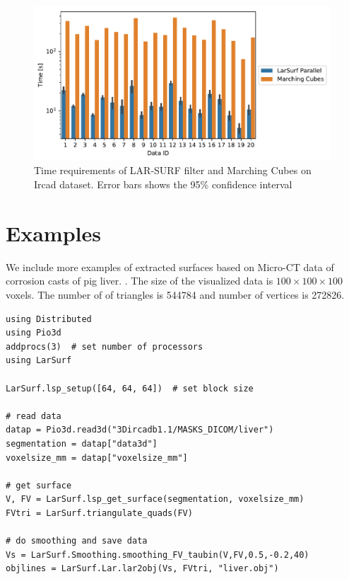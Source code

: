 \documentclass[11pt, oneside]{amsart}   	%
\begin{document}
\begin{figure}
\centering
\includegraphics[width=0.99\textwidth]{figs/ircad_comparison.pdf} 
\caption{Time requirements of LAR-SURF filter and Marching Cubes on Ircad dataset. Error bars shows the 95\% confidence interval}
\label{fig:ircad_comparison}
\end{figure}



%
\section{Examples}\label{sec:examples}



We include more examples of extracted surfaces based on Micro-CT data of corrosion casts of pig liver.
\cite{eberlova2017use}.
The size of the visualized data is $100\times100\times100$ voxels. The number of of triangles is 
544784 and number of vertices is 272826.

% 
\begin{lstlisting}[caption=Read from DICOM files]
using Distributed
using Pio3d
addprocs(3)  # set number of processors
using LarSurf

LarSurf.lsp_setup([64, 64, 64])  # set block size

# read data
datap = Pio3d.read3d("3Dircadb1.1/MASKS_DICOM/liver")
segmentation = datap["data3d"]
voxelsize_mm = datap["voxelsize_mm"]

# get surface
V, FV = LarSurf.lsp_get_surface(segmentation, voxelsize_mm)
FVtri = LarSurf.triangulate_quads(FV)

# do smoothing and save data
Vs = LarSurf.Smoothing.smoothing_FV_taubin(V,FV,0.5,-0.2,40)
objlines = LarSurf.Lar.lar2obj(Vs, FVtri, "liver.obj")
\end{lstlisting}
\end{document}
